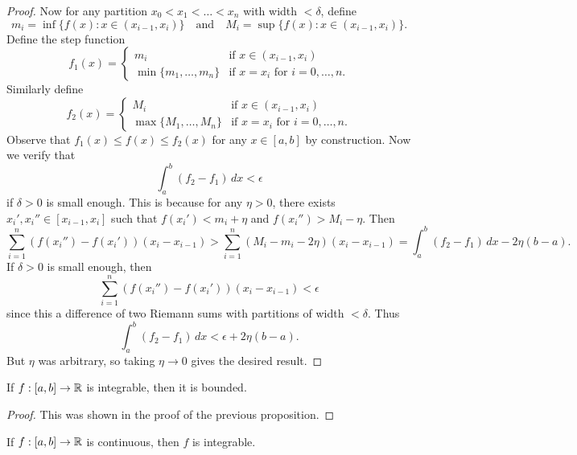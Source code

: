 \begin{proof}
  Now for any partition $x_0 < x_1 < \dots < x_n$
  with width $< \delta$, define
  \[
    m_i = \inf \{f(x) : x \in (x_{i - 1}, x_i)\}
    \quad \text{and} \quad
    M_i = \sup \{f(x) : x \in (x_{i - 1}, x_i)\}.
  \]
  Define the step function
  \[
    f_1(x) =
    \begin{cases}
      m_i & \text{if } x \in (x_{i - 1}, x_i) \\
      \min\{m_1, \dots, m_n\} & \text{if } x = x_i \text{ for } i = 0, \dots, n.
    \end{cases}
  \]
  Similarly define
  \[
    f_2(x) =
    \begin{cases}
      M_i & \text{if } x \in (x_{i - 1}, x_i) \\
      \max\{M_1, \dots, M_n\} & \text{if } x = x_i \text{ for } i = 0, \dots, n.
    \end{cases}
  \]
  Observe that $f_1(x) \le f(x) \le f_2(x)$ for
  any $x \in [a, b]$ by construction. Now we verify
  that
  \[
    \int_a^b (f_2 - f_1)\, dx < \epsilon
  \]
  if $\delta > 0$ is small enough. This is because
  for any $\eta > 0$, there exists $x_i', x_i'' \in [x_{i - 1}, x_i]$
  such that $f(x_i') < m_i + \eta$ and
  $f(x_i'') > M_i - \eta$. Then
  \[
    \sum_{i = 1}^n (f(x_i'') - f(x_i'))(x_i - x_{i - 1})
    > \sum_{i = 1}^n (M_i - m_i - 2\eta)(x_i - x_{i - 1})
    = \int_a^b (f_2 - f_1)\, dx - 2\eta(b - a).
  \]
  If $\delta > 0$ is small enough, then
  \[
    \sum_{i = 1}^n (f(x_i'') - f(x_i'))(x_i - x_{i - 1})
    < \epsilon
  \]
  since this a difference of two Riemann sums with
  partitions of width $< \delta$. Thus
  \[
    \int_a^b (f_2 - f_1)\, dx < \epsilon + 2\eta(b - a).
  \]
  But $\eta$ was arbitrary, so taking $\eta \to 0$
  gives the desired result.
\end{proof}

\begin{corollary}
  If $f : [a, b] \to \mathbb{R}$ is integrable, then it is
  bounded.
\end{corollary}

\begin{proof}
  This was shown in the proof of the previous proposition.
\end{proof}

\begin{theorem}
  If $f : [a, b] \to \mathbb{R}$ is continuous, then $f$ is
  integrable.
\end{theorem}

